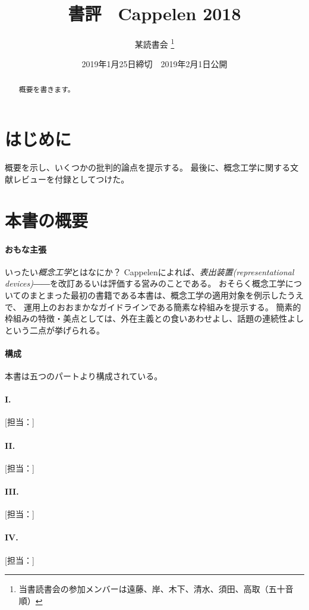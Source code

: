 \documentclass[dvipdfmx,autodetect-engine]{jsarticle}
\title{書評　Cappelen 2018 }
\author{某読書会
\footnote{当書読書会の参加メンバーは遠藤、岸、木下、清水、須田、高取（五十音順）}
}
\date{2019年1月25日締切　2019年2月1日公開}
\begin{document}
\maketitle

\begin{abstract}
概要を書きます。
\cite{Cappelen2018a}
\end{abstract}

\section{はじめに}
概要を示し、いくつかの批判的論点を提示する。
最後に、概念工学に関する文献レビューを付録としてつけた。

\section{本書の概要}
\paragraph{おもな主張}
いったい\emph{概念工学}とはなにか？
Cappelenによれば、\emph{表出装置(representational devices)}――を改訂あるいは評価する営みのことである。
おそらく概念工学についてのまとまった最初の書籍である本書は、概念工学の適用対象を例示したうえで、
運用上のおおまかなガイドラインである簡素な枠組みを提示する。
簡素的枠組みの特徴・美点としては、外在主義との食いあわせよし、話題の連続性よしという二点が挙げられる。

\paragraph{構成}
本書は五つのパートより構成されている。

\paragraph{I. }
[担当：]

\paragraph{II. }
[担当：]

\paragraph{III. }
[担当：]

\paragraph{IV. }
[担当：]
\end{document}
